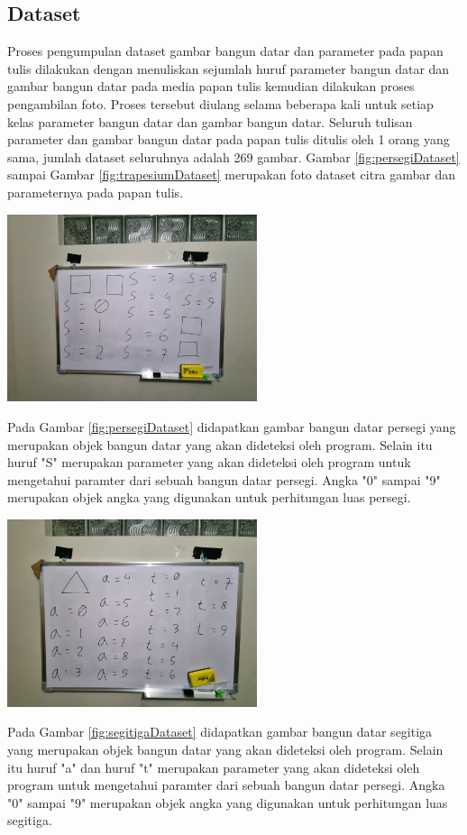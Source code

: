 \subsection{Dataset}
\label{subsection:Dataset}
Proses pengumpulan dataset gambar bangun datar dan parameter pada papan tulis dilakukan dengan menuliskan sejumlah huruf parameter bangun datar dan gambar bangun datar pada media papan tulis kemudian dilakukan proses pengambilan foto. Proses tersebut diulang selama beberapa kali untuk setiap kelas parameter bangun datar dan gambar bangun datar. Seluruh tulisan parameter dan gambar bangun datar pada papan tulis ditulis oleh 1 orang yang sama, jumlah dataset seluruhnya adalah 269 gambar. Gambar \ref{fig:persegiDataset} sampai Gambar \ref{fig:trapesiumDataset} merupakan foto dataset citra gambar dan parameternya pada papan tulis.
\begin{center}
	\includegraphics[width=0.55\textwidth]{gambar/BangunParameter.jpg}	
	\label{fig:persegiDataset}
\end{center}
Pada Gambar \ref{fig:persegiDataset} didapatkan gambar bangun datar persegi yang merupakan objek bangun datar yang akan dideteksi oleh program. Selain itu huruf "S" merupakan parameter yang akan dideteksi oleh program untuk mengetahui paramter dari sebuah bangun datar persegi. Angka "0" sampai "9" merupakan objek angka yang digunakan untuk perhitungan luas persegi.

\begin{center}
	\includegraphics[width=0.55\textwidth]{gambar/Segitiga Dataset.jpg}	
	\label{fig:segitigaDataset}
\end{center}
Pada Gambar \ref{fig:segitigaDataset} didapatkan gambar bangun datar segitiga yang merupakan objek bangun datar yang akan dideteksi oleh program. Selain itu huruf "a" dan huruf "t" merupakan parameter yang akan dideteksi oleh program untuk mengetahui paramter dari sebuah bangun datar persegi. Angka "0" sampai "9" merupakan objek angka yang digunakan untuk perhitungan luas segitiga.

